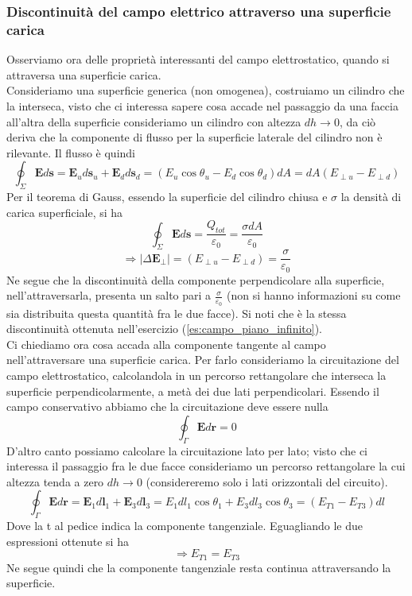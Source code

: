\documentclass[
10pt, %
a4paper, %
oneside, %
headinclude,footinclude, %
BCOR5mm, %
]{scrartcl}
\begin{document}
\subsubsection{Discontinuità del campo elettrico attraverso una superficie carica}
Osserviamo ora delle proprietà interessanti del campo elettrostatico, quando si attraversa una superficie carica.\\
Consideriamo una superficie generica (non omogenea), costruiamo un cilindro che la interseca, visto che ci interessa sapere cosa accade nel passaggio da una faccia all'altra della superficie consideriamo un cilindro con altezza \(dh\to 0\), da ciò deriva che la componente di flusso per la superficie laterale del cilindro non è rilevante. Il flusso è quindi
\[\oint_{\Sigma}\mathbf{E}d\mathbf{s} = \mathbf{E}_{u}d\mathbf{s}_{u}+\mathbf{E}_{d}d\mathbf{s}_d=(E_u\cos\theta_u-E_d\cos\theta_d)dA = dA(E_{\perp u}-E_{\perp d})\] 
Per il teorema di Gauss, essendo la superficie del cilindro chiusa e $\sigma$ la densità di carica superficiale, si ha
\[\oint_{\Sigma}\mathbf{E}d\mathbf{s} = \frac{Q_{tot}}{\varepsilon_0} = \frac{\sigma dA}{\varepsilon_0}\] 
\[\Rightarrow |\Delta \mathbf{E}_{\perp}| = (E_{\perp u} - E_{\perp d}) = \frac{\sigma}{\varepsilon_0}\]
Ne segue che la discontinuità della componente perpendicolare alla superficie, nell'attraversarla, presenta un salto pari a \(\frac{\sigma}{\varepsilon_0}\) (non si hanno informazioni su come sia distribuita questa quantità fra le due facce). Si noti che è la stessa discontinuità ottenuta nell'esercizio (\ref{es:campo_piano_infinito}).\\
Ci chiediamo ora cosa accada alla componente tangente al campo nell'attraversare una superficie carica. Per farlo consideriamo la circuitazione del campo elettrostatico, calcolandola in un percorso rettangolare che interseca la superficie perpendicolarmente, a metà dei due lati perpendicolari. Essendo il campo conservativo abbiamo che la circuitazione deve essere nulla
\[\oint_\Gamma\mathbf{E}d\mathbf{r} = 0\]
D'altro canto possiamo calcolare la circuitazione lato per lato; visto che ci interessa il passaggio fra le due facce consideriamo un percorso rettangolare la cui altezza tenda a zero \(dh\to 0\) (considereremo solo i lati orizzontali del circuito).  
\[\oint_\Gamma \mathbf{E}d\mathbf{r} = \mathbf{E}_1 d\mathbf{l}_1 + \mathbf{E}_3d\mathbf{l}_3 = E_1dl_1\cos\theta_1 + E_3dl_3\cos\theta_3 = (E_{T1}-E_{T3})dl\]
Dove la t al pedice indica la componente tangenziale. Eguagliando le due espressioni ottenute si ha
\[\Rightarrow E_{T1}=E_{T3}\]
Ne segue quindi che la componente tangenziale resta continua attraversando la superficie. 
\end{document}
